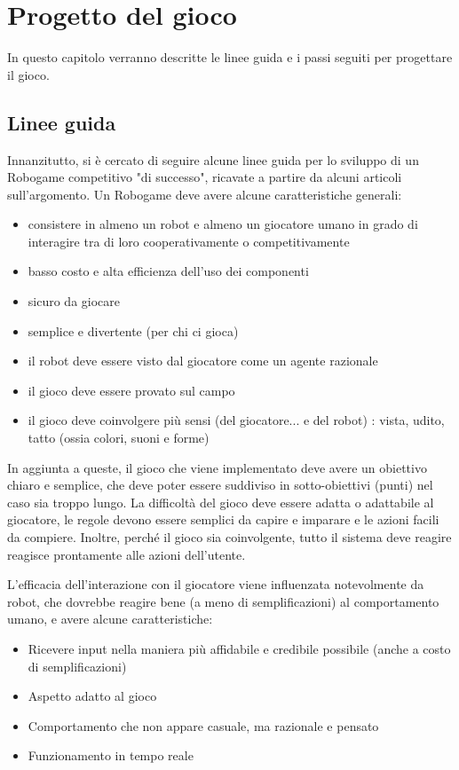 \chapter{Progetto del gioco}
\label{cap:progetto}

In questo capitolo verranno descritte le linee guida e i passi seguiti per progettare il gioco.

\section{Linee guida}
Innanzitutto, si è cercato di seguire alcune linee guida per lo sviluppo di un Robogame competitivo "di successo", ricavate a partire da alcuni articoli sull'argomento. Un Robogame deve avere alcune caratteristiche generali:
\begin{itemize}
\item consistere in almeno un robot e almeno un giocatore umano in grado di interagire tra di loro cooperativamente o competitivamente
\item basso costo e alta efficienza dell’uso dei componenti
\item sicuro da giocare
\item semplice e divertente (per chi ci gioca)
\item il robot deve essere visto dal giocatore come un agente razionale
\item il gioco deve essere provato sul campo
\item il gioco deve coinvolgere più sensi (del giocatore... e del robot) : vista, udito, tatto (ossia colori, suoni e forme)
\end{itemize}
In aggiunta a queste, il gioco che viene implementato deve avere un obiettivo chiaro e semplice, che deve poter essere suddiviso in sotto-obiettivi (punti) nel caso sia troppo lungo. La difficoltà del gioco deve essere adatta o adattabile al giocatore, le regole devono essere semplici da capire e imparare e le azioni facili da compiere. Inoltre, perché il gioco sia coinvolgente, tutto il sistema deve reagire reagisce prontamente alle azioni dell'utente.

L'efficacia dell'interazione con il giocatore viene influenzata notevolmente da robot, che dovrebbe reagire bene (a meno di semplificazioni) al comportamento umano, e avere alcune caratteristiche:
\begin{itemize}
\item Ricevere input nella maniera più affidabile e credibile possibile (anche a costo di semplificazioni)
\item Aspetto adatto al gioco
\item Comportamento che non appare casuale, ma razionale e pensato
\item Funzionamento in tempo reale
\end{itemize}

